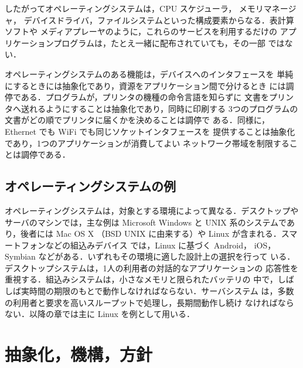 \documentclass[../main.tex]{subfiles}
\begin{document}
したがってオペレーティングシステムは，CPU スケジューラ，%
%
メモリマネージャ，
デバイスドライバ，ファイルシステムといった構成要素からなる．表計算ソフトや
メディアプレーヤのように，これらのサービスを利用するだけの
アプリケーションプログラムは，たとえ一緒に配布されていても，その一部
ではない．

\begin{example}
  オペレーティングシステムのある機能は，デバイスへのインタフェースを
  単純にするときには抽象化であり，資源をアプリケーション間で分けるとき
  には調停である．プログラムが，プリンタの機種の命令言語を知らずに
  文書をプリンタへ送れるようにすることは抽象化であり，同時に印刷する
  3つのプログラムの文書がどの順でプリンタに届くかを決めることは調停で
  ある．同様に，Ethernet でも WiFi でも同じソケットインタフェースを
  提供することは抽象化であり，1つのアプリケーションが消費してよい
  ネットワーク帯域を制限することは調停である．
\end{example}

\subsection{オペレーティングシステムの例}

オペレーティングシステムは，対象とする環境によって異なる．デスクトップやサーバのマシンでは，主な例は
Microsoft Windows と UNIX 系のシステムであり，後者には Mac OS X
（BSD UNIX に由来する）や Linux が含まれる．スマートフォンなどの組込みデバイス
では，Linux に基づく Android，%
iOS，Symbian などがある．いずれもその環境に適した設計上の選択を行って
いる．デスクトップシステムは，1人の利用者の対話的なアプリケーションの
応答性を重視する．組込みシステムは，小さなメモリと限られたバッテリの
中で，しばしば実時間の期限のもとで動作しなければならない．サーバシステム
は，多数の利用者と要求を高いスループットで処理し，長期間動作し続け
なければならない．以降の章では主に Linux を例として用いる．

\section{抽象化，機構，方針}
\label{sec:l01-elements}
\end{document}
